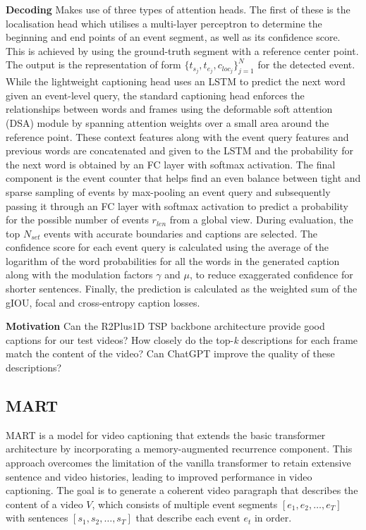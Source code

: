 \textbf{Decoding} Makes use of three types of attention heads. The first of these is the localisation head which utilises a multi-layer perceptron to determine the beginning and end points of an event segment, as well as its confidence score. This is achieved by using the ground-truth segment with a reference center point. The output is the representation of form $ \{t_{s_j}, t_{e_j}, c_{loc_j}\}_{j=1}^N $ for the detected event. While the lightweight captioning head uses an LSTM to predict the next word given an event-level query, the standard captioning head enforces the relationships between words and frames using the deformable soft attention (DSA) module by spanning attention weights over a small area around the reference point. These context features along with the event query features and previous words are concatenated and given to the LSTM and the probability for the next word is obtained by an FC layer with softmax activation. The final component is the event counter that helps find an even balance between tight and sparse sampling of events by max-pooling an event query and subsequently passing it through an FC layer with softmax activation to predict a probability for the possible number of events $r_{len}$ from a global view. During evaluation, the top $N_{set}$ events with accurate boundaries and captions are selected. The confidence score for each event query is calculated using the average of the logarithm of the word probabilities for all the words in the generated caption along with the modulation factors $\gamma$ and $\mu$, to reduce exaggerated confidence for shorter sentences. Finally, the prediction is calculated as the weighted sum of the gIOU, focal and cross-entropy caption losses.

\textbf{Motivation} Can the R2Plus1D TSP backbone architecture provide good captions for our test videos? How closely do the top-\textit{k} descriptions for each frame match the content of the video? Can ChatGPT improve the quality of these descriptions?

\subsection{MART}
MART \cite{liu2020mobile} is a model for video captioning that extends the basic transformer architecture by incorporating a memory-augmented recurrence component. This approach overcomes the limitation of the vanilla transformer to retain extensive sentence and video histories, leading to improved performance in video captioning.
The goal is to generate a coherent video paragraph that describes the content of a video $V$, which consists of multiple event segments $[e_1,e_2,\dots,e_T]$ with sentences $[s_1, s_2, \dots, s_T]$ that describe each event $e_t$ in order.

